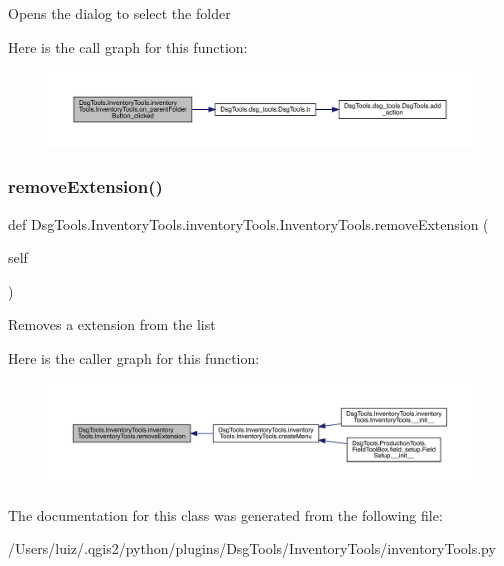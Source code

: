 \begin{DoxyVerb}Opens the dialog to select the folder
\end{DoxyVerb}
 Here is the call graph for this function\+:
\nopagebreak
\begin{figure}[H]
\begin{center}
\leavevmode
\includegraphics[width=350pt]{class_dsg_tools_1_1_inventory_tools_1_1inventory_tools_1_1_inventory_tools_a649ffb9c920baee6c52f8477c9fc3a0e_cgraph}
\end{center}
\end{figure}
\mbox{\label{class_dsg_tools_1_1_inventory_tools_1_1inventory_tools_1_1_inventory_tools_aa4ce23cbaf7b5c1c23e11e1925cefae9}} 
\subsubsection{\texorpdfstring{remove\+Extension()}{removeExtension()}}
{\footnotesize\ttfamily def Dsg\+Tools.\+Inventory\+Tools.\+inventory\+Tools.\+Inventory\+Tools.\+remove\+Extension (\begin{DoxyParamCaption}\item[{}]{self }\end{DoxyParamCaption})}

\begin{DoxyVerb}Removes a extension from the list
\end{DoxyVerb}
 Here is the caller graph for this function\+:
\nopagebreak
\begin{figure}[H]
\begin{center}
\leavevmode
\includegraphics[width=350pt]{class_dsg_tools_1_1_inventory_tools_1_1inventory_tools_1_1_inventory_tools_aa4ce23cbaf7b5c1c23e11e1925cefae9_icgraph}
\end{center}
\end{figure}


The documentation for this class was generated from the following file\+:\begin{DoxyCompactItemize}
\item 
/\+Users/luiz/.\+qgis2/python/plugins/\+Dsg\+Tools/\+Inventory\+Tools/inventory\+Tools.\+py\end{DoxyCompactItemize}
